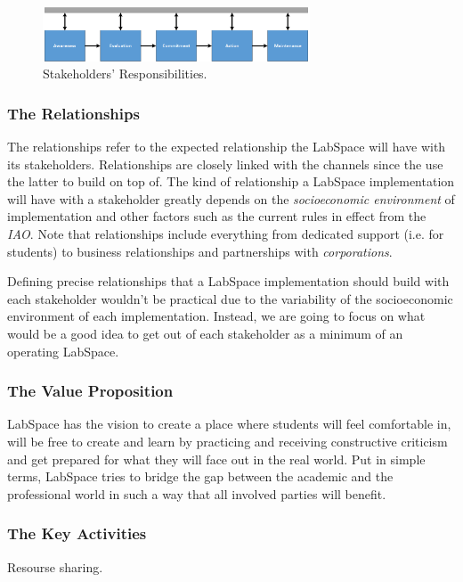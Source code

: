 \documentclass[a4paper, 11pt]{article}
\begin{document}
\begin{figure}[h!]
  \begin{center}
    \includegraphics[width=300px,height=\textheight,keepaspectratio]{imagery/ls_impl.png}
    \caption{Stakeholders' Responsibilities.}
    \label{fig:implementation}
  \end{center}
\end{figure}

\subsubsection{The Relationships} \label{sec:bm_rel}

The relationships refer to the expected relationship the LabSpace will have with its stakeholders. Relationships are closely linked with the channels since the use the latter to build on top of. The kind of relationship a LabSpace implementation will have with a stakeholder greatly depends on the \textit{socioeconomic environment} of implementation and other factors such as the current rules in effect from the \textit{IAO}. Note that relationships include everything from dedicated support (i.e. for students) to business relationships and partnerships with \textit{corporations}.

Defining precise relationships that a LabSpace implementation should build with each stakeholder wouldn't be practical due to the variability of the socioeconomic environment of each implementation. Instead, we are going to focus on what would be a good idea to get out of each stakeholder as a minimum of an operating LabSpace.


\subsubsection{The Value Proposition}

LabSpace has the vision to create a place where students will feel comfortable in, will be free to create and learn by practicing and receiving constructive criticism and get prepared for what they will face out in the real world. Put in simple terms, LabSpace tries to bridge the gap between the academic and the professional world in such a way that all involved parties will benefit. 

\subsubsection{The Key Activities} \label{sec:bm_activities}
Resourse sharing.
\end{document}

